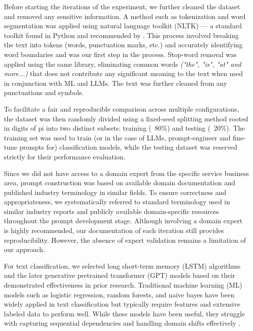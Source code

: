 Before starting the iterations of the experiment, we further cleaned the dataset and removed any sensitive information. A method such as tokenization and word segmentation was applied using natural language toolkit (NLTK) --- a standard toolkit found in Python and recommended by \cite{bird2009nlp}. This process involved breaking the text into tokens (words, punctuation marks, etc.) and accurately identifying word boundaries and was our first step in the process. Stop-word removal was applied using the same library, eliminating common words \textit{("the", "is", "at" and more...)} that does not contribute any significant meaning to the text when used in conjunction with ML and LLMs. The text was further cleaned from any punctuations and symbols.

To facilitate a fair and reproducible comparison across multiple configurations, the dataset was then randomly divided using a fixed-seed splitting method rooted in digits of pi into two distinct subsets: training (~80\%) and testing (~20\%). The training set was used to train (or in the case of LLMs, prompt-engineer and fine-tune prompts for) classification models, while the testing dataset was reserved strictly for their performance evaluation.

Since we did not have access to a domain expert from the specific service business area, prompt construction was based on available domain documentation and published industry terminology in similar fields. To ensure correctness and appropriateness, we systematically referred to standard terminology used in similar industry reports and publicly available domain-specific resources throughout the prompt development stage. Although involving a domain expert is highly recommended, our documentation of each iteration still provides reproducibility. However, the absence of expert validation remains a limitation of our approach.

%
%
For text classification, we selected long short-term memory (LSTM) algorithms and the later generative pretrained transformer (GPT) models based on their demonstrated effectiveness in prior research. Traditional machine learning (ML) models such as logistic regression, random forests, and naive bayes have been widely applied in text classification but typically require features and extensive labeled data to perform well. While these models have been useful, they struggle with capturing sequential dependencies and handling domain shifts effectively \cite{sarker2021machine}.

